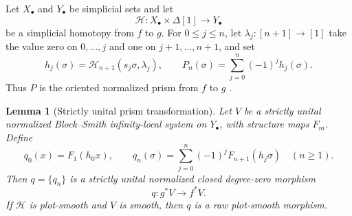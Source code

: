 \documentclass[12pt]{amsart}
\newtheorem{lem}[thm]{Lemma}
\theoremstyle{definition}
\theoremstyle{remark}
\numberwithin{equation}{section}
\newcommand{\1}{{\mathbb{1}}}
\begin{document}
Let $X_\bullet$ and $Y_\bullet$ be simplicial sets and let
\[
 \mathcal H:X_\bullet\times\Delta[1]\longrightarrow Y_\bullet
\]
be a simplicial homotopy from $f$ to $g$.  For
$0\leq j\leq n$, let $\lambda_j:[n+1]\to[1]$ take the value zero on
$0,\ldots,j$ and one on $j+1,\ldots,n+1$, and set
\[
 h_j(\sigma)=
 \mathcal H_{n+1}(s_j\sigma,\lambda_j),
 \qquad
 P_n(\sigma)=\sum_{j=0}^n(-1)^j h_j(\sigma).
\]
Thus $P$ is the oriented normalized prism from $f$ to $g$
\cite{May67}.

\begin{lem}[Strictly unital prism transformation]
\label{lem:prism-transformation}
Let $V$ be a strictly unital normalized Block--Smith
infinity-local system on $Y_\bullet$, with structure maps $F_m$.
Define
\begin{equation}\label{eq:unital-prism-components}
 q_0(x)=F_1(h_0x),
 \qquad
 q_n(\sigma)=
 \sum_{j=0}^n(-1)^jF_{n+1}(h_j\sigma)
 \quad(n\geq1).
\end{equation}
Then $q=\{q_n\}$ is a strictly unital normalized closed degree-zero
morphism
\[
 q:g^*V\longrightarrow f^*V.
\]
If $\mathcal H$ is plot-smooth and $V$ is smooth, then $q$ is a raw
plot-smooth morphism.
\end{lem}
\end{document}
